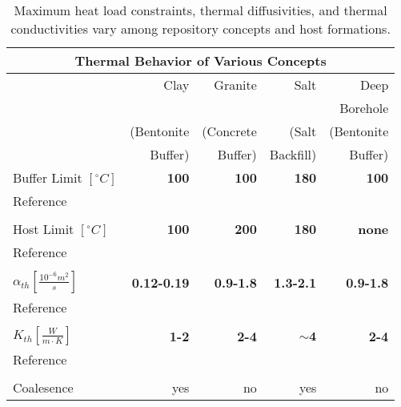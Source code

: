 %
\begin{table}[h!]
  \centering
  \footnotesize{
  \begin{tabular}{|l|r|r|r|r|}
    \multicolumn{5}{c}{\textbf{Thermal Behavior of Various Concepts}}\\
    \hline
            & Clay & Granite & Salt & Deep \\ 
            & & & & Borehole \\ 
            & (Bentonite & (Concrete & (Salt & (Bentonite\\ 
            & Buffer) & Buffer) & Backfill) & Buffer) \\ 
    \hline
    Buffer Limit $[^{\circ}C]$ & \textbf{100}  & \textbf{100}  & \textbf{180} & \textbf{100}  \\ 
    Reference
    & \cite{hardin_generic_2011}   
    & \cite{von_lensa_red-impact_2008}   
    & \cite{von_lensa_red-impact_2008,brewitz_long-term_2002}   
    & \cite{von_lensa_red-impact_2008}  \\ 
    &      &      &     &      \\
    Host Limit $[^{\circ}C]$   & \textbf{100}  & \textbf{200}  & \textbf{180} & \textbf{none} \\ 
    Reference                     
    & \cite{andra_argile:_2005}   
    & \cite{von_lensa_red-impact_2008}   
    & \cite{hardin_generic_2011}   
    & \cite{hardin_generic_2011, brady_deep_2009}   \\
    &      &      &     &      \\
    $\alpha_{th} [\frac{10^{-6}m^2}{s}]$ & \textbf{0.12-0.19} & \textbf{0.9-1.8} & \textbf{1.3-2.1} &\textbf{ 0.9-1.8} \\ 
    Reference                     
    & \cite{tikhonravova_effect_2007} 
    & \cite{durham_thermal_1987,hardin_generic_2011,kim_thermal_2007}     
    & \cite{hardin_generic_2011,nieland_storage_2001}   
    & \cite{durham_thermal_1987,hardin_generic_2011,kim_thermal_2007}   \\ 
    &      &      &     &      \\
    $K_{th} [\frac{W}{m{\cdot}K}]$ & \textbf{1-2} & \textbf{2-4} & $\mathbf{\sim4}$  & \textbf{2-4} \\ 
    Reference                     
    & \cite{hardin_generic_2011,tikhonravova_effect_2007}    
    & \cite{hardin_generic_2011,kim_thermal_2007,surma_porosity_2003,ab_long-term_2006}    
    & \cite{hardin_generic_2011,nieland_storage_2001}
    & \cite{hardin_generic_2011,kim_thermal_2007,surma_porosity_2003}\\ 
    &      &      &     &      \\
    Coalesence & yes & no & yes & no \\ 
    \hline
  \end{tabular}
  \caption[Models for Heat Transport for Various Geologies]{Maximum heat load constraints, thermal 
  diffusivities, and thermal conductivities vary among repository concepts and host formations. }
  }
  \label{tab:heat_tab}
\end{table}
